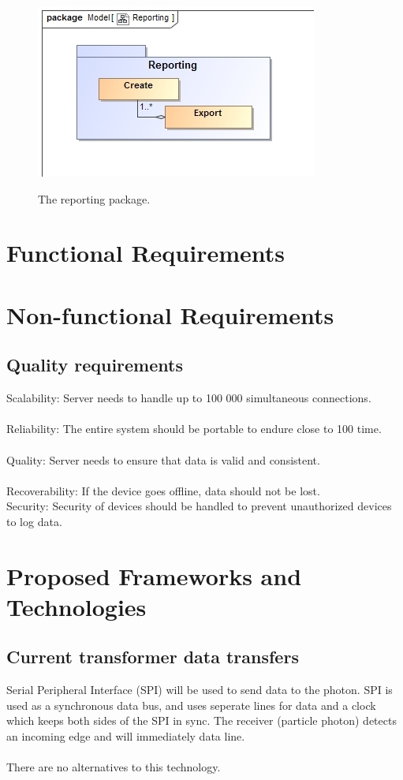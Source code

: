 \documentclass[paper=a4, fontsize=11pt]{scrartcl} %
\begin{document}
	\begin{figure}[H]
		\includegraphics[width=\textwidth]{images/Reporting.jpg}  \\
		\caption{The reporting package.}
	\end{figure}
	\newpage
	\section{Functional Requirements}
	\newpage
	\section{Non-functional Requirements}
	\subsection{Quality requirements}
	Scalability: Server needs to handle up to 100 000 simultaneous connections.\\
	\\Reliability: The entire system should be portable to endure close to 100%
	time.\\
	\\Quality: Server needs to ensure that data is valid and consistent.\\
	\\Recoverability: If the device goes offline, data should not be lost.\\
	Security: Security of devices should be handled to prevent unauthorized
	devices to log data.
	\newpage
	\section{Proposed Frameworks and Technologies}
	\subsection{Current transformer data transfers}
	Serial Peripheral Interface (SPI) will be used to send data to the photon. SPI is used as a synchronous data bus,
	and uses seperate lines for data and a clock which keeps both sides of the SPI in sync. The receiver (particle photon) detects an incoming 
	edge and will immediately data line.\\
	\\There are no alternatives to this technology.
\end{document}

